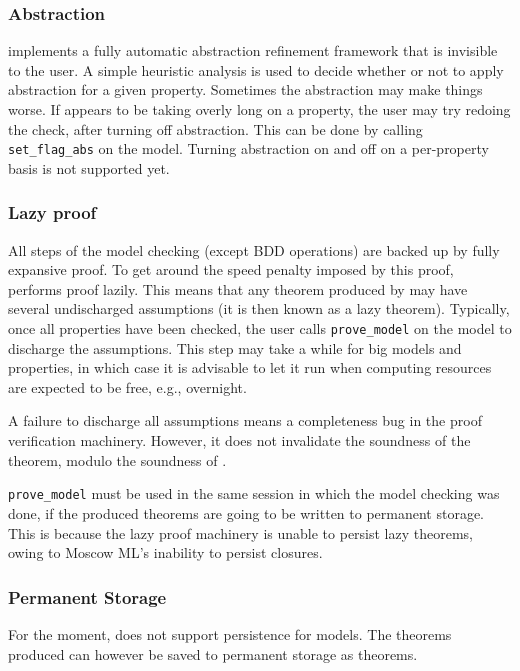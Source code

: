 \subsubsection{Abstraction}

\hc{} implements a fully automatic abstraction refinement framework that is invisible to the user. A simple heuristic analysis is used to decide whether or not to apply abstraction for a given property. Sometimes the abstraction may make things worse. If \hc{} appears to be taking overly long on a property, the user may try redoing the check, after turning off abstraction. This can be done by calling \texttt{set\_flag\_abs} on the model. Turning abstraction on and off on a per-property basis is not supported yet.

\subsubsection{Lazy proof}

All steps of the model checking (except BDD operations) are backed up by fully expansive proof. To get around the speed penalty imposed by this proof, \hc{} performs proof lazily. This means that any theorem produced by \hc{} may have several undischarged assumptions (it is then known as a lazy theorem). Typically, once all properties have been checked, the user calls \texttt{prove\_model} on the model to discharge the assumptions. This step may take a while for big models and properties, in which case it is advisable to let it run when computing resources are expected to be free, e.g., overnight.

A failure to discharge all assumptions means a completeness bug in the \hc{} proof verification machinery. However, it does not invalidate the soundness of the theorem, modulo the soundness of \HOL{}.

\texttt{prove\_model} must be used in the same session in which the model checking was done, if the produced theorems are going to be written to permanent storage. This is because the lazy proof machinery is unable to persist lazy theorems, owing to Moscow ML's inability to persist closures.

\subsubsection{Permanent Storage}

For the moment, \hc{} does not support persistence for models. The theorems produced can however be saved to permanent storage as \HOL{} theorems.

